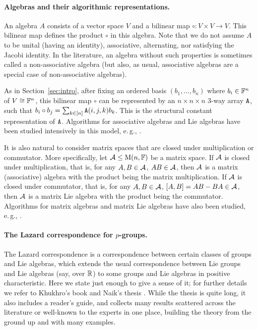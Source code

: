 \documentclass[11pt]{article}
\begin{document}
\paragraph{Algebras and their algorithmic representations.} An algebra $A$ 
consists of a vector space $V$ and a bilinear map $\circ: V\times V\to V$. This 
bilinear map defines the 
product $\circ$ in this algebra. Note that we do not assume $A$ to be unital 
(having an identity), associative, alternating, nor satisfying the Jacobi 
identity. In the literature, an algebra without such properties is sometimes 
called a non-associative algebra (but also, as usual, associative algebras are a special case of non-associative 
algebras).

As in Section~\ref{sec:intro}, after fixing 
an ordered basis $(b_1, \dots, b_n)$ where $b_i\in\mathbb{F}^n$ of $V\cong \mathbb{F}^n$, this 
bilinear map $\circ$ can be represented by an $n\times n\times n$ 3-way array $\mathtt{A}$, 
such that $b_i\circ b_j=\sum_{k\in[n]}\mathtt{A}(i,j,k)b_k$. This is the structural 
constant representation of $\mathtt{A}$. Algorithms for associative algebras and Lie 
algebras have been studied intensively in this model, e.\,g., \cite{IR99,Gra00}.

It is also natural to consider matrix spaces that are closed under multiplication 
or commutator. More specifically, let $\mathcal{A}\leq \mathrm{M}(n, \mathbb{F})$ be a matrix space. If 
$\mathcal{A}$ is closed under multiplication, that is, for any $A, B\in\mathcal{A}$, $AB\in \mathcal{A}$, 
then $\mathcal{A}$ is a matrix (associative) algebra with the product being the matrix 
multiplication. If $\mathcal{A}$ is closed under commutator, that is, for any $A, B\in 
\mathcal{A}$, $[A,B]=AB-BA\in\mathcal{A}$, then $\mathcal{A}$ is a matrix Lie algebra with the product 
being the commutator. Algorithms for matrix algebras and matrix Lie algebras have 
also been studied, e.\,g., \cite{EG00,Iva00,IR99}.

\paragraph{The Lazard correspondence for $p$-groups.} The Lazard correspondence is 
a correspondence between certain classes of groups and Lie algebras, which 
extends the usual correspondence between Lie groups and Lie algebras (say, over 
$\mathbb{R}$) to some groups and Lie algebras in positive characteristic. Here we state 
just enough to give a sense of it; for further details we refer to Khukhro's book 
\cite{khukhro} and Naik's thesis \cite{naik}. While the thesis is quite long, it also includes a 
reader's guide, and collects many results scattered across the literature or 
well-known to the experts in one place, building the theory from the ground up and 
with many examples.
\end{document}
